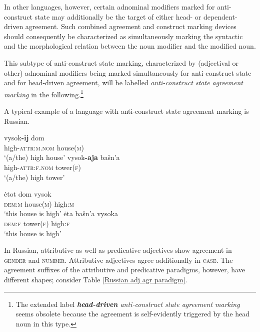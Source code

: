 In other languages, however, certain adnominal modifiers marked for anti-construct state may additionally be the target of either head- or dependent-driven agreement. Such combined agreement and construct marking devices should consequently be characterized as simultaneously marking the syntactic and the morphological relation between the noun modifier and the modified noun. 

This subtype of anti-construct state marking, characterized by (adjectival or other) adnominal modifiers being marked simultaneously for anti-construct state and for head-driven agreement, will be labelled \emph{anti-construct state agreement marking} in the following.\footnote{The extended label \emph{\textbf{head-driven} anti-construct state agreement marking} seems obsolete because the agreement is self-evidently triggered by the head noun in this type.} %

A typical example of a language with anti-construct state agreement marking is Russian.
\begin{exe}
\ex
{} \label{ru-anti}
\begin{xlist}
\begin{xlist}
\ex
\gll 	vysok\textbf{-ij} 			dom\\
	high-\textsc{attr:m.nom} house(\textsc{m})\\
\glt	 ‘(a/the) high house’
\ex
\gll 	vysok\textbf{-aja} 			bašn'a\\
	high-\textsc{attr:f.nom} tower(\textsc{f})\\
\glt	 ‘(a/the) high tower’
\end{xlist}
\begin{xlist}
\ex 
\gll 	\.etot 	dom	vysok\\
	\textsc{dem:m} house(\textsc{m}) 	high:\textsc{m}\\
\glt	 ‘this house is high’
\ex
\gll 	\.eta 	bašn'a	vysoka\\
	\textsc{dem:f} tower(\textsc{f}) 	high:\textsc{f}\\
\glt	 ‘this house is high’
\end{xlist}
\end{xlist}
\end{exe}
In Russian, attributive as well as predicative adjectives show agreement in \textsc{gender} and \textsc{number}. Attributive adjectives agree additionally in \textsc{case}. The agreement suffixes of the attributive and predicative paradigms, however, have different shapes; consider Table \ref{Russian adj agr paradigm}.

